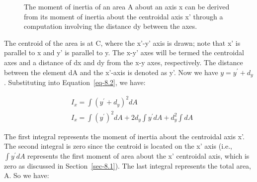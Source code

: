 \documentclass[
  letterpaper,
  DIV=11,
  numbers=noendperiod]{scrreprt}
\theoremstyle{definition}
\theoremstyle{remark}
\begin{document}
\begin{figure}


\caption{\label{fig-8.6}The moment of inertia of an area A about an axis
x can be derived from its moment of inertia about the centroidal axis x'
through a computation involving the distance dy between the axes.}

\end{figure}%

The centroid of the area is at C, where the x'-y' axis is drawn; note
that x' is parallel to x and y' is parallel to y. The x-y' axes will be
termed the centroidal axes and a distance of dx and dy from the x-y
axes, respectively. The distance between the element dA and the x'-axis
is denoted as y'. Now we have \(y=y^{\prime}+d_y\). Substituting into
Equation~\ref{eq-8.2}, we have:

\[
\begin{aligned}
& I_x=\int\left(y^{\prime}+d_y\right)^2 d A \\
& I_x=\int\left(y^{\prime}\right)^2 d A+2 d_y \int y^{\prime} d A+d_y^2 \int d A
\end{aligned}
\]

The first integral represents the moment of inertia about the centroidal
axis x'. The second integral is zero since the centroid is located on
the x' axis (i.e., \(\int y^{\prime} d A\) represents the first moment
of area about the x' centroidal axis, which is zero as discussed in
Section~\ref{sec-8.1}). The last integral represents the total area, A.
So we have:
\end{document}
